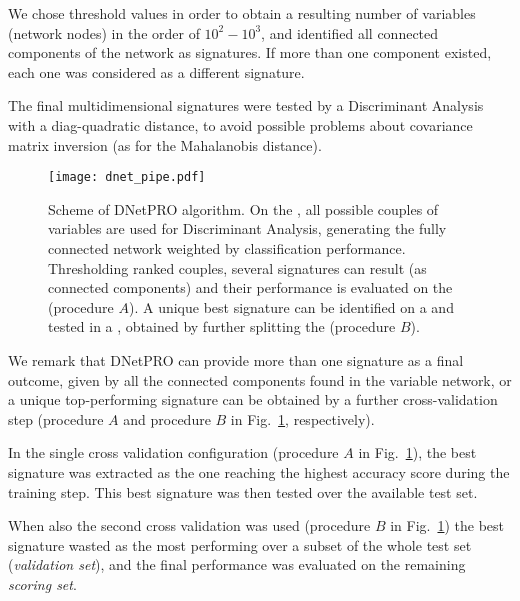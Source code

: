 \documentclass{standalone}
\begin{document}
We chose threshold values in order to obtain a resulting number of variables (network nodes) in the order of $10^2-10^3$, and identified all connected components of the network as signatures.
If more than one component existed, each one was considered as a different signature.

The final multidimensional signatures were tested by a Discriminant Analysis with a diag-quadratic distance, to avoid possible problems about covariance matrix inversion (as for the Mahalanobis distance).

\begin{center}
\begin{figure}[htbp]
\centering
\texttt{[image: dnet\_pipe.pdf]}
\caption{Scheme of DNetPRO algorithm.
On the , all possible couples of variables are used for Discriminant Analysis, generating the fully connected network weighted by classification performance.
Thresholding ranked couples, several signatures can result (as connected components) and their performance is evaluated on the  (procedure $A$).
A unique best signature can be identified on a  and tested in a , obtained by further splitting the  (procedure $B$).
}
\label{fig:dnet_pipe}
\end{figure}
\end{center}

We remark that DNetPRO can provide more than one signature as a final outcome, given by all the connected components found in the variable network, or a unique top-performing signature can be obtained by a further cross-validation step (procedure $A$ and procedure $B$ in Fig.~\ref{fig:dnet_pipe}, respectively).

In the single cross validation configuration (procedure $A$ in Fig.~\ref{fig:dnet_pipe}), the best signature was extracted as the one reaching the highest accuracy score during the training step.
This best signature was then tested over the available test set.

When also the second cross validation was used (procedure $B$ in Fig.~\ref{fig:dnet_pipe}) the best signature wasted as the most performing over a subset of the whole test set (\emph{validation set}), and the final performance was evaluated on the remaining \emph{scoring set}.
\end{document}
